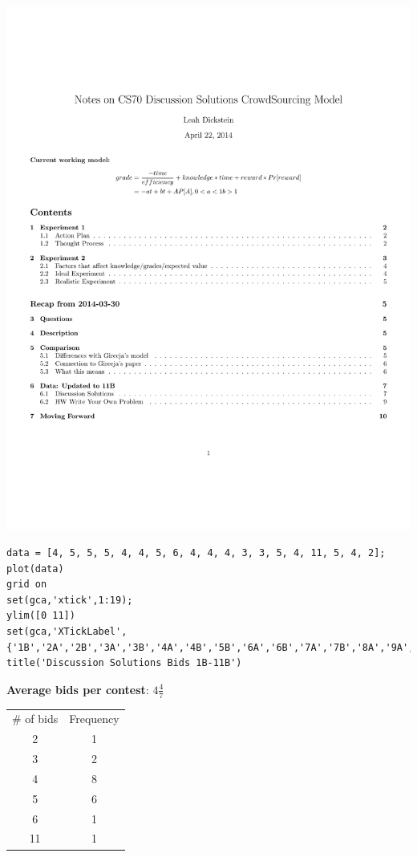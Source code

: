 \documentclass[leqno]{article}
\begin{document}
\includegraphics[scale=0.5]{140421}\\

\begin{verbatim}
data = [4, 5, 5, 5, 4, 4, 5, 6, 4, 4, 4, 3, 3, 5, 4, 11, 5, 4, 2];
plot(data)
grid on
set(gca,'xtick',1:19);
ylim([0 11])
set(gca,'XTickLabel',{'1B','2A','2B','3A','3B','4A','4B','5B','6A','6B','7A','7B','8A','9A','9B','10A','10B','11A','11B'})
title('Discussion Solutions Bids 1B-11B')
\end{verbatim}

\textbf{Average bids per contest}: $4\frac{4}{7}$\\

\begin{tabular}{c c}
\# of bids & Frequency\\
2 & 1\\
3 & 2\\
4 & 8\\
5 & 6\\
6 & 1\\
11 & 1\\
\end{tabular}
\end{document}
